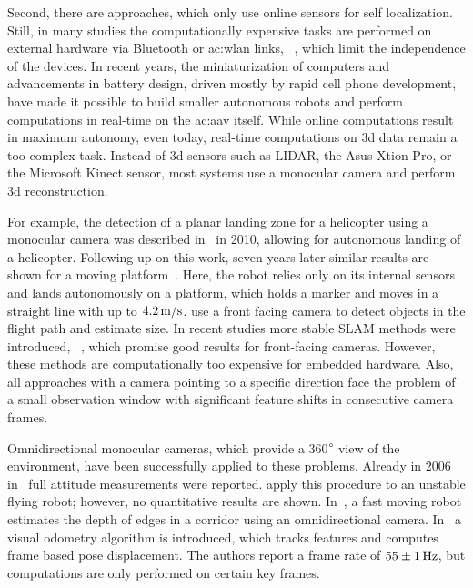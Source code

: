 Second, there are approaches, which only use online sensors for self localization.
Still, in many studies the computationally expensive tasks are performed on external hardware via Bluetooth or \gls{ac:wlan} links, \eg~\cite{engel14ras,zhang2016controllable}, which limit the independence of the devices.
In recent years, the miniaturization of computers and advancements in battery design, driven mostly by rapid cell phone development, have made it possible to build smaller autonomous robots and perform computations in real-time on the \gls{ac:aav} itself.
While online computations result in maximum autonomy, even today, real-time computations on 3d data remain a too complex task.
Instead of 3d sensors such as LIDAR, the Asus Xtion Pro, or the Microsoft Kinect sensor, most systems use a monocular camera and perform 3d reconstruction.

For example, the detection of a planar landing zone for a helicopter using a monocular camera was described in~\cite{5584396} in 2010, allowing for autonomous landing of a helicopter.
Following up on this work, seven years later similar results are shown for a moving platform~\cite{falanga2017vision}.
Here, the robot relies only on its internal sensors and lands autonomously on a platform, which holds a marker and moves in a straight line with up to $\unit[4.2]{m/s}$.
\cite{6630807} use a front facing camera to detect objects in the flight path and estimate size.
In recent studies more stable SLAM methods were introduced, \eg~\cite{7219438,engel2014lsd,engel2017direct}, which promise good results for front-facing cameras.
However, these methods are computationally too expensive for embedded hardware.
Also, all approaches with a camera pointing to a specific direction face the problem of a small observation window with significant feature shifts in consecutive camera frames.

Omnidirectional monocular cameras, which provide a 360$\degree$ view of the environment, have been successfully applied to these problems.
Already in 2006 in~\cite{demonceaux2006omnidirectional} full attitude measurements were reported.
\cite{rodriguez2012real} apply this procedure to an unstable flying robot; however, no quantitative results are shown.
In~\cite{lukierski2017room}, a fast moving robot estimates the depth of edges in a corridor using an omnidirectional camera.
In~\cite{forster2014svo} a visual odometry algorithm is introduced, which tracks features and computes frame based pose displacement.
The authors report a frame rate of $\unit[55 \pm 1]{Hz}$, but computations are only performed on certain key frames.

